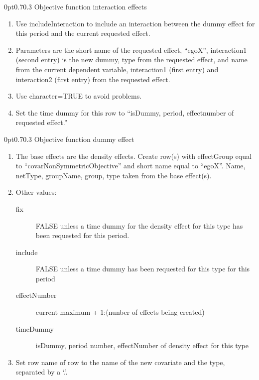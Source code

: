 \documentclass[12pt,a4paper]{article}
\makeatletter
\renewcommand{\=}{\,=\,}
\newcommand{\+}{\,+\,}
\renewcommand{\subsection}{\@startsection{subsection}{2}
                {0pt}{0.7\baselineskip}{0.3\baselineskip}
                {\sffamily} }
\makeatother
\begin{document}
\subsection{Objective function interaction effects}
\label{sec:objint}
\begin{enumerate}
\item Use includeInteraction to include an interaction between the dummy effect
for this period and the current requested effect.
\item Parameters are the short name of the requested effect, ``egoX'',
interaction1 (second entry) is the new dummy, type from the requested effect,
and name from the current dependent variable, interaction1 (first entry) and
interaction2 (first entry) from the requested effect.
\item Use character=TRUE to avoid problems.
\item Set the time dummy for this row to ``isDummy, period, effectnumber of
requested effect.''
\end{enumerate}
\subsection{Objective function dummy effect}
\label{sec:nonrate}
\begin{enumerate}
\item The base effects are the density effects. Create row(s) with effectGroup
equal to ``covarNonSymmetricObjective'' and short name equal to ``egoX''. Name,
netType, groupName, group, type taken from the base effect(s).
\item Other values:
\begin{description}
\item[fix] FALSE unless a time dummy for the density effect for this type
has been requested for this period.
\item[include] FALSE unless a time dummy has been requested for this type for
  this period
\item[effectNumber] current maximum + 1:(nunber of effects being created)
\item[timeDummy] isDummy, period number, effectNumber of density effect for this
  type
\end{description}

\item Set row name of row to the name of the new covariate and the type,
  separated by a `.'.
\end{enumerate}
\end{document}
